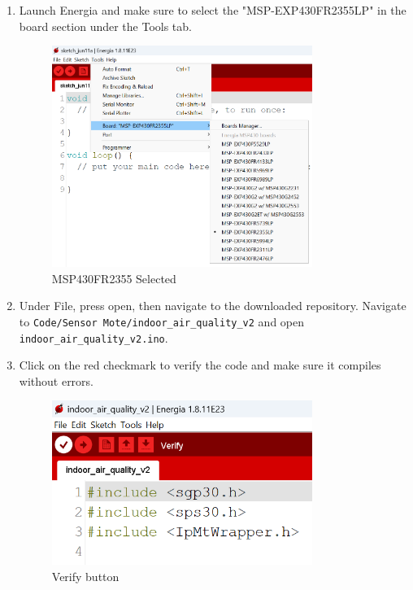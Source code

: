 \begin{enumerate}
\item Launch Energia and make sure to select the "MSP-EXP430FR2355LP" in the board section under the Tools tab.

\begin{figure}[H]
    \centering
    \includegraphics[width=0.8\textwidth]{Pictures/Energia Started and board selected.png}
    \caption[MSP430FR2355 Selected]{MSP430FR2355 Selected} 
    \label{fig:part1commrin}
\end{figure}

\item Under File, press open, then navigate to the downloaded repository. Navigate to \texttt{Code/Sensor Mote/indoor\_air\_quality\_v2} and open \texttt{indoor\_air\_quality\_v2.ino}.
\item Click on the red checkmark to verify the code and make sure it compiles without errors.

\begin{figure}[H]
    \centering
    \includegraphics[width=0.8\textwidth]{Pictures/Verify Button.png}
    \caption[Verify button]{Verify button} 
    \label{fig:part1commrin}
\end{figure}


\end{enumerate}
